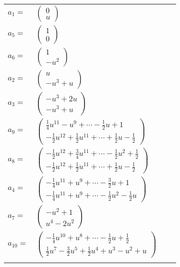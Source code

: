 \documentclass[1p]{elsarticle_modified}
\theoremstyle{definition}
\begin{document}
\begin{tabular}{m{7pt} m{180pt} m{7pt} m{180pt} }
\flushright $a_{1}=$&$\begin{pmatrix}0\\u\end{pmatrix}$ \\
\flushright $a_{5}=$&$\begin{pmatrix}1\\0\end{pmatrix}$ \\
\flushright $a_{6}=$&$\begin{pmatrix}1\\- u^2\end{pmatrix}$ \\
\flushright $a_{2}=$&$\begin{pmatrix}u\\- u^3+u\end{pmatrix}$ \\
\flushright $a_{3}=$&$\begin{pmatrix}- u^3+2 u\\- u^3+u\end{pmatrix}$ \\
\flushright $a_{9}=$&$\begin{pmatrix}\frac{1}{4} u^{11}- u^9+\cdots-\frac{1}{2} u+1\\-\frac{1}{2} u^{12}+\frac{1}{2} u^{11}+\cdots+\frac{1}{2} u-\frac{1}{2}\end{pmatrix}$ \\
\flushright $a_{8}=$&$\begin{pmatrix}-\frac{1}{2} u^{12}+\frac{3}{4} u^{11}+\cdots-\frac{1}{2} u^2+\frac{1}{2}\\-\frac{1}{2} u^{12}+\frac{1}{2} u^{11}+\cdots+\frac{1}{2} u-\frac{1}{2}\end{pmatrix}$ \\
\flushright $a_{4}=$&$\begin{pmatrix}-\frac{1}{4} u^{11}+u^9+\cdots-\frac{3}{2} u+1\\-\frac{1}{4} u^{11}+u^9+\cdots-\frac{1}{2} u^2-\frac{1}{2} u\end{pmatrix}$ \\
\flushright $a_{7}=$&$\begin{pmatrix}- u^2+1\\u^4-2 u^2\end{pmatrix}$ \\
\flushright $a_{10}=$&$\begin{pmatrix}-\frac{1}{4} u^{10}+u^8+\cdots-\frac{1}{2} u+\frac{1}{2}\\\frac{1}{2} u^7-\frac{3}{2} u^5+\frac{1}{2} u^4+u^3- u^2+u\end{pmatrix}$\\&\end{tabular}
\end{document}
